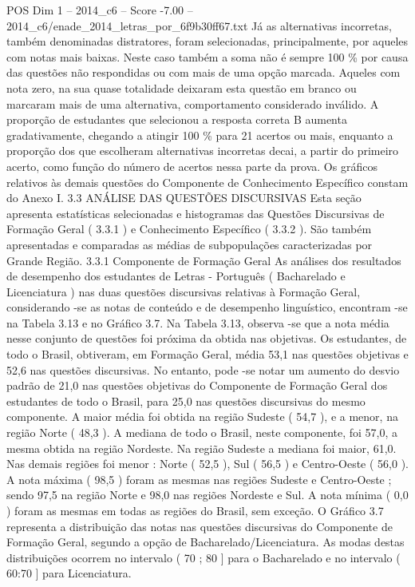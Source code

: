 \begin{textsample}{POS Dim 1 – 2014\_c6 – Score -7.00 – 2014\_c6/enade\_2014\_letras\_por\_6f9b30ff67.txt}
Já as alternativas incorretas, também denominadas distratores, foram selecionadas, principalmente, por aqueles com notas mais baixas.
Neste caso também a soma não é sempre 100 \% por causa das questões não respondidas ou com mais de uma opção marcada.
Aqueles com nota zero, na sua quase totalidade deixaram esta questão em branco ou marcaram mais de uma alternativa, comportamento considerado inválido.
A proporção de estudantes que selecionou a resposta correta B aumenta gradativamente, chegando a atingir 100 \% para 21 acertos ou mais, enquanto a proporção dos que escolheram alternativas incorretas decai, a partir do primeiro acerto, como função do número de acertos nessa parte da prova.
Os gráficos relativos às demais questões do Componente de Conhecimento Específico constam do Anexo I. 3.3 ANÁLISE DAS QUESTÕES DISCURSIVAS Esta seção apresenta estatísticas selecionadas e histogramas das Questões Discursivas de Formação Geral ( 3.3.1 ) e Conhecimento Específico ( 3.3.2 ).
São também apresentadas e comparadas as médias de subpopulações caracterizadas por Grande Região. 3.3.1 Componente de Formação Geral As análises dos resultados de desempenho dos estudantes de Letras - Português ( Bacharelado e Licenciatura ) nas duas questões discursivas relativas à Formação Geral, considerando -se as notas de conteúdo e de desempenho linguístico, encontram -se na Tabela 3.13 e no Gráfico 3.7.
Na Tabela 3.13, observa -se que a nota média nesse conjunto de questões foi próxima da obtida nas objetivas.
Os estudantes, de todo o Brasil, obtiveram, em Formação Geral, média 53,1 nas questões objetivas e 52,6 nas questões discursivas.
No entanto, pode -se notar um aumento do desvio padrão de 21,0 nas questões objetivas do Componente de Formação Geral dos estudantes de todo o Brasil, para 25,0 nas questões discursivas do mesmo componente.
A maior média foi obtida na região Sudeste ( 54,7 ), e a menor, na região Norte ( 48,3 ).
A mediana de todo o Brasil, neste componente, foi 57,0, a mesma obtida na região Nordeste.
Na região Sudeste a mediana foi maior, 61,0.
Nas demais regiões foi menor : Norte ( 52,5 ), Sul ( 56,5 ) e Centro-Oeste ( 56,0 ).
A nota máxima ( 98,5 ) foram as mesmas nas regiões Sudeste e Centro-Oeste ; sendo 97,5 na região Norte e 98,0 nas regiões Nordeste e Sul.
A nota mínima ( 0,0 ) foram as mesmas em todas as regiões do Brasil, sem exceção.
O Gráfico 3.7 representa a distribuição das notas nas questões discursivas do Componente de Formação Geral, segundo a opção de Bacharelado/Licenciatura.
As modas destas distribuições ocorrem no intervalo ( 70 ; 80 ] para o Bacharelado e no intervalo ( 60:70 ] para Licenciatura.

\end{textsample}

